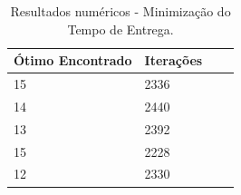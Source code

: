 \documentclass[conference]{IEEEtran}
\begin{document}
	\begin{table}
		\centering
		\begin{tabular}{ | l | l | l | l |}
			\hline
			Ótimo Encontrado & Iterações \\ \hline
			15 & 2336 \\ \hline
			14 & 2440 \\ \hline
			13 & 2392 \\ \hline
			15 & 2228 \\ \hline
			12 & 2330 \\ \hline
		\end{tabular}
		\label{table:result}
		\caption{Resultados numéricos - Minimização do Tempo de Entrega.}
	\end{table}

%


%
\end{document}
